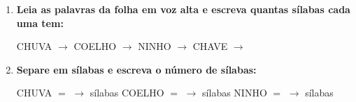 \begin{exercicio}
\begin{enumerate}[resume]
  \item \textbf{Leia as palavras da folha em voz alta e escreva quantas sílabas cada uma tem:}

  \begin{center}
  CHUVA $\rightarrow$ \underline{\hspace{1cm}} \quad COELHO $\rightarrow$ \underline{\hspace{1cm}} \quad NINHO $\rightarrow$ \underline{\hspace{1cm}} \quad CHAVE $\rightarrow$ \underline{\hspace{1cm}}
  \end{center}

  \item \textbf{Separe em sílabas e escreva o número de sílabas:}
  \begin{center}
  CHUVA $=$ \underline{\hspace{1.2cm}} $\rightarrow$ \underline{\hspace{0.8cm}} sílabas \quad COELHO $=$ \underline{\hspace{1.2cm}} $\rightarrow$ \underline{\hspace{0.8cm}} sílabas \quad NINHO $=$ \underline{\hspace{1.2cm}} $\rightarrow$ \underline{\hspace{0.8cm}} sílabas
  \end{center}

\end{enumerate}

\end{exercicio}



